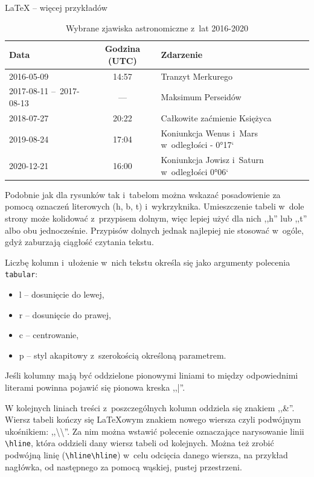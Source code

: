 \begin{easyappendix}{\LaTeX{} -- więcej przykładów}
\begin{table}[!ht]
	\caption{\label{tab:zjawiska}Wybrane zjawiska astronomiczne z~lat 2016-2020}
	\centering
	\begin{tabular}{p{2.5cm}|c|l}
		Data        &   Godzina (UTC)   &   Zdarzenie\\\hline\hline
		2016-05-09  &   14:57           &   Tranzyt Merkurego\\\hline
		2017-08-11 --~2017-08-13  & --- &   Maksimum Perseidów \\\hline
		2018-07-27  &   20:22           &   Całkowite zaćmienie Księżyca\\\hline
		2019-08-24  &   17:04           &   Koniunkcja Wenus i~Mars w~odległości - 0°17`\\\hline
		2020-12-21  &   16:00           &   Koniunkcja Jowisz i~Saturn w~odległości 0°06`
	\end{tabular}
\end{table}

Podobnie jak dla rysunków tak i~tabelom można wskazać posadowienie za pomocą oznaczeń literowych (h, b, t) i~wykrzyknika. Umieszczenie tabeli w~dole strony może kolidować z~przypisem dolnym, więc lepiej użyć dla nich ,,h'' lub ,,t'' albo obu jednocześnie. Przypisów dolnych jednak najlepiej nie stosować w~ogóle, gdyż zaburzają ciągłość czytania tekstu.

 Liczbę kolumn i~ułożenie w~nich tekstu określa się jako argumenty polecenia \texttt{tabular}:
\begin{itemize}
	\item l -- dosunięcie do lewej,
	\item r -- dosunięcie do prawej,
	\item c -- centrowanie,
	\item p -- styl akapitowy z~szerokością określoną parametrem.
\end{itemize}
Jeśli kolumny mają być oddzielone pionowymi liniami to między odpowiednimi literami powinna pojawić się pionowa kreska ,,|''.

W kolejnych liniach treści z~poszczególnych kolumn oddziela się znakiem ,,\&''. Wiersz tabeli kończy się {\LaTeX}owym znakiem nowego wiersza czyli podwójnym ukośnikiem: ,,\textbackslash\textbackslash''. Za nim można wstawić polecenie oznaczające narysowanie linii \texttt{\textbackslash{}hline}, która oddzieli dany wiersz tabeli od kolejnych. Można też zrobić podwójną linię (\texttt{\textbackslash{}hline\textbackslash{}hline}) w~celu odcięcia danego wiersza, na przykład nagłówka, od następnego za pomocą wąskiej, pustej przestrzeni.


\end{easyappendix}
